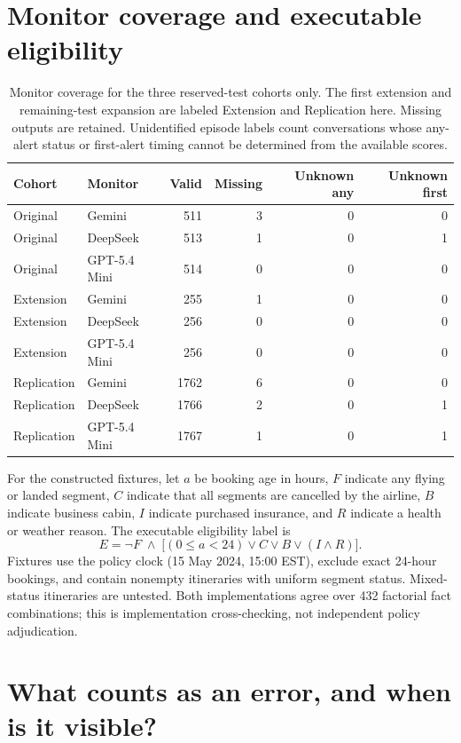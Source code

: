 \section{Monitor coverage and executable eligibility}
\begin{table}[h]\centering\small
\caption{Monitor coverage for the three reserved-test cohorts only. The first extension and remaining-test expansion are labeled Extension and Replication here. Missing outputs are retained. Unidentified episode labels count conversations whose any-alert status or first-alert timing cannot be determined from the available scores.}\label{tab:coverage}
\begin{tabular}{llrrrr}
\toprule
Cohort & Monitor & Valid & Missing & Unknown any & Unknown first\\
\midrule
Original & Gemini & 511 & 3 & 0 & 0\\
Original & DeepSeek & 513 & 1 & 0 & 1\\
Original & GPT-5.4 Mini & 514 & 0 & 0 & 0\\
Extension & Gemini & 255 & 1 & 0 & 0\\
Extension & DeepSeek & 256 & 0 & 0 & 0\\
Extension & GPT-5.4 Mini & 256 & 0 & 0 & 0\\
Replication & Gemini & 1762 & 6 & 0 & 0\\
Replication & DeepSeek & 1766 & 2 & 0 & 1\\
Replication & GPT-5.4 Mini & 1767 & 1 & 0 & 1\\
\bottomrule
\end{tabular}
\end{table}
For the constructed fixtures, let $a$ be booking age in hours, $F$ indicate any flying or landed segment, $C$ indicate that all segments are cancelled by the airline, $B$ indicate business cabin, $I$ indicate purchased insurance, and $R$ indicate a health or weather reason. The executable eligibility label is
\[ E=\neg F\;\land\;\bigl[(0\leq a<24)\lor C\lor B\lor(I\land R)\bigr]. \]
Fixtures use the policy clock (15 May 2024, 15:00 EST), exclude exact 24-hour bookings, and contain nonempty itineraries with uniform segment status. Mixed-status itineraries are untested. Both implementations agree over 432 factorial fact combinations; this is implementation cross-checking, not independent policy adjudication.

\section{What counts as an error, and when is it visible?}
\label{sec:targets}
